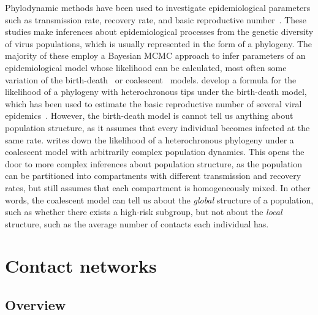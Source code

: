 Phylodynamic methods have been used to investigate epidemiological parameters
such as transmission rate, recovery rate, and basic reproductive
number~\autocite{pybus2009evolutionary, volz2013viral}. These studies make
inferences about epidemiological processes from the genetic diversity of virus
populations, which is usually represented in the form of a phylogeny. The
majority of these employ a Bayesian \gls{MCMC} approach to infer parameters of
an epidemiological model whose likelihood can be calculated, most often some
variation of the birth-death~\autocite{kendall1948generalized} or
coalescent~\autocite{kingman1982coalescent} models.
\textcite{stadler2012estimating} develop a formula for the likelihood of a
phylogeny with heterochronous tips under the birth-death model, which has been
used to estimate the basic reproductive number of several viral
epidemics~\autocite{stadler2012estimating}. However, the birth-death model is
cannot tell us anything about population structure, as it assumes that every
individual becomes infected at the same rate. \textcite{volz2012complex} writes
down the likelihood of a heterochronous phylogeny under a coalescent model with
arbitrarily complex population dynamics. This opens the door to more complex
inferences about population structure, as the population can be partitioned
into compartments with different transmission and recovery rates, but still
assumes that each compartment is homogeneously mixed. In other words, the
coalescent model can tell us about the \emph{global} structure of a population,
such as whether there exists a high-risk subgroup, but not about the
\emph{local} structure, such as the average number of contacts each individual
has. 

\section{Contact networks}
\label{sec:contactnet}

\subsection{Overview}
\label{subsec:netoverview}

